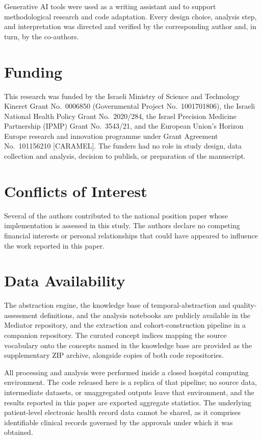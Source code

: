 Generative AI tools were used as a writing assistant and to support
methodological research and code adaptation. Every design choice, analysis
step, and interpretation was directed and verified by the corresponding
author and, in turn, by the co-authors.

\section*{Funding}
This research was funded by the Israeli Ministry of Science and Technology
Kineret Grant No.~0006850 (Governmental Project No.~1001701806), the Israeli
National Health Policy Grant No.~2020/284, the Israel Precision Medicine
Partnership (IPMP) Grant No.~3543/21, and the European Union's Horizon Europe
research and innovation programme under Grant Agreement No.~101156210
[CARAMEL]. The funders had no role in study design, data collection and
analysis, decision to publish, or preparation of the manuscript.

\section*{Conflicts of Interest}
Several of the authors contributed to the national position paper whose
implementation is assessed in this study. The authors declare no competing
financial interests or personal relationships that could have appeared to
influence the work reported in this paper.

\section*{Data Availability}
The abstraction engine, the knowledge base of temporal-abstraction and
quality-assessment definitions, and the analysis notebooks are publicly
available in the Mediator repository,\citep{mediator-github} and the
extraction and cohort-construction pipeline in a companion repository.\citep{kineret-etl-github} The curated concept indices mapping the source
vocabulary onto the concepts named in the knowledge base are provided as
the supplementary ZIP archive, alongside copies of both code repositories.

All processing and analysis were performed inside a closed hospital computing
environment. The code released here is a replica of that pipeline; no source
data, intermediate datasets, or unaggregated outputs leave that environment,
and the results reported in this paper are exported aggregate statistics. The
underlying patient-level electronic health record data cannot be shared, as
it comprises identifiable clinical records governed by the approvals under
which it was obtained.

